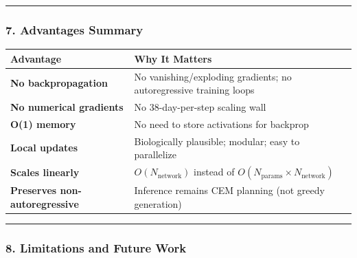 \documentclass[
  11pt,
  a4paper,
]{article}
\begin{document}
\begin{center}\rule{0.5\linewidth}{0.5pt}\end{center}

\subsubsection{7. Advantages Summary}\label{advantages-summary}

\begin{longtable}[]{@{}
  >{\raggedright\arraybackslash}p{}
  >{\raggedright\arraybackslash}p{}
  >{\raggedright\arraybackslash}p{}@{}}
\toprule\noalign{}
\begin{minipage}[b]{\linewidth}\raggedright
Advantage
\end{minipage} & \begin{minipage}[b]{\linewidth}\raggedright
Why It Matters
\end{minipage} & \begin{minipage}[b]{\linewidth}\raggedright
\end{minipage} \\
\midrule\noalign{}
\endhead
\bottomrule\noalign{}
\endlastfoot
\textbf{No backpropagation} & No vanishing/exploding gradients; no
autoregressive training loops & \\
\textbf{No numerical gradients} & No 38-day-per-step scaling wall & \\
\textbf{O(1) memory} & No need to store activations for backprop & \\
\textbf{Local updates} & Biologically plausible; modular; easy to
parallelize & \\
\textbf{Scales linearly} & \(O(N_{\text{network}})\) instead of
\(O(N_{\text{params}} \times N_{\text{network}})\) & \\
\textbf{Preserves non-autoregressive} & Inference remains CEM planning
(not greedy generation) & \\
\end{longtable}

\begin{center}\rule{0.5\linewidth}{0.5pt}\end{center}

\subsubsection{8. Limitations and Future
Work}\label{limitations-and-future-work-2}
\end{document}
